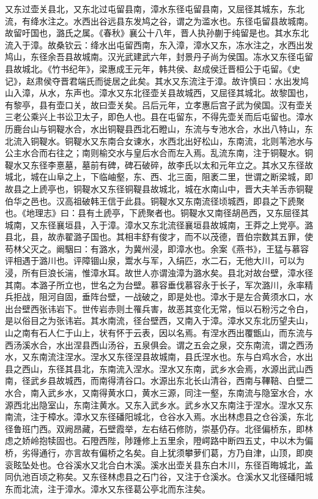 \documentclass[12pt,UTF8]{ctexbook}
\begin{document}
又东过壶关县北，又东北过屯留县南，漳水东径屯留县南，又屈径其城东，东北流，有绛水注之。水西出谷远县东发鸠之谷，谓之为滥水也。东径屯留县故城南。故留吁国也，潞氏之属。《春秋》襄公十八年，晋人执孙蒯于纯留是也。其水东北流入于漳。故桑钦云：绛水出屯留西南，东入漳，漳水又东，冻水注之，水西出发鸠山，东径余吾县故城南。汉光武建武六年，封景丹子尚为侯国。冻水又东径屯留县故城北。《竹书纪年》，梁惠成王元年，韩共侯、赵成侯迁晋桓公于屯留。《史记》，赵肃侯夺晋君端氏而徙居之此矣。其水又东流注于漳。故许慎曰：水出发鸠山入漳，从水，东声也。漳水又东北径壶关县故城西，又屈径其城北。故黎国也，有黎亭，县有壶口关，故曰壶关矣。吕后元年，立孝惠后宫子武为侯国。汉有壶关三老公乘兴上书讼卫太子，即色人也。县在屯留东，不得先壶关而后屯留也。漳水历鹿台山与铜鞮水合，水出铜鞮县西北石瞪山，东流与专池水合，水出八特山，东北流入铜鞮水。铜鞮水又东南合女谏水，水西北出好松山，东南流，北则苇池水与公主水合而右往之；南则榆交水与皇后水合而左入焉。乱流东南，注于铜鞮水。铜鞮水又东径李憙墓，墓前有碑，碑石破碎，故李氏以太和元年立之。其水又东径故城北，城在山阜之上，下临岫壑，东、西、北三面，阻袤二里，世谓之断梁城，即故县之上虒亭也，铜鞮水又东径铜鞮县故城北，城在水南山中，晋大夫羊舌赤铜鞮伯华之邑也。汉高祖破韩王信于此县。铜鞮水又东南流径顷城西，即县之下虒聚也。《地理志》曰：县有土虒亭，下虒聚者也。铜鞮水又南径胡邑西，又东屈径其城南，又东径襄垣县，入于漳。漳水又东北流径襄垣县故城南，王莽之上党亭。潞县北，县，故赤翟潞子国也。其相丰舒有俊才，而不以茂德，晋伯宗数其五罪，使苟林父灭之。阚駰曰：有潞水，为冀州浸，即漳水也。余案《燕书》，王猛与慕容评相遇于潞川也。评障锢山泉，鬻水与军，入绢匹，水二石，无他大川，可以为浸，所有巨浪长湍，惟漳水耳。故世人亦谓浊漳为潞水矣。县北对故台壁，漳水径其南。本潞子所立也，世名之为台壁。慕容垂伐慕容永于长子，军次潞川，永率精兵拒战，阻河自固，垂阵台壁，一战破之，即是处也。漳水于是左合黄须水口，水出台壁西张讳岩下。世传岩赤则土罹兵害，故恶其变化无常，恒以石粉污之令白，是以俗目之为张讳岩。其水南流，径台壁西，又南入于漳。漳水又东北历望夫山，山之南有石人仁于山上，状有怀于云表，因以名焉。有涅水西出覆甑山，而东流与西汤溪水合，水出涅县西山汤谷，五泉俱会。谓之五会之泉，交东南流，谓之西汤水，又东南流注涅水。涅水又东径涅县故城南，县氏涅水也。东与白鸡水合，水出县之西山，东径其县北，东南流入涅水。涅水又东南，武乡水会焉，水源出武山西南，径武乡县故城西，而南得清谷口。水源出东北长山清谷，西南与鞸鞛、白壁二水合，南入武乡水，又南得黄水口，黄水三源，同注一壑，东南流与隐室水合，水源西北出隐室山，东南注黄水。又东入武乡水。武乡水又东南注于涅水。涅水又东南流，注于樟水。漳水又东径磻阳城北，仓谷水入焉。水出林虑县之仓谷溪，东北径鲁班门西。双阙昂藏，石壁霞举，左右结石修防，崇基仍存。北径偏桥东，即林虑之娇岭抱犊固也。石隥西陛，陟踵修上五里余，隥崿路中断四五丈，中以木为偏桥，劣得通行，亦言故有偏桥之名矣。自上犹须攀萝们葛，方乃自津，山顶，即庾衮眩坠处也。仓谷溪水又北合白木溪。溪水出壶关县东白木川，东径百晦城北，盖同仇池百顷之称矣。又东径林虑县之石门谷，又注于仓溪水。仓溪水又北径磻阳城东而北流，注于漳水。漳水又东径葛公亭北而东注矣。
\end{document}
